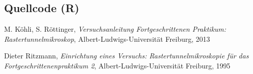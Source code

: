 \documentclass[12pt]{article}
\newcommand{\code}[1]{\texttt{#1}}
\begin{document}
\subsection{Quellcode (R)}
%

\newpage
\listoffigures


\newpage
\thispagestyle{empty}
\begin{thebibliography}{9}

  

  
  

M. Köhli, S. Röttinger,
\emph{Versuchsanleitung Fortgeschrittenen Praktikum: Rastertunnelmikroskop},
Albert-Ludwigs-Universität Freiburg,
2013

Dieter Ritzmann,
\emph{Einrichtung eines Versuchs: Rastertunnelmikroskopie für das Fortgeschrittenenpraktikum 2},
Albert-Ludwigs-Universität Freiburg,
1995


\end{thebibliography}
\end{document}
